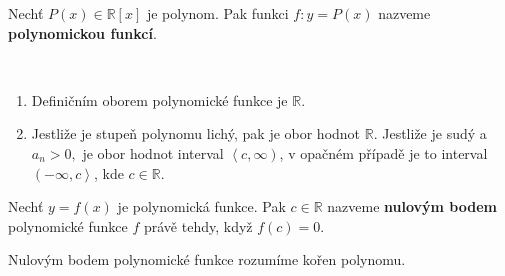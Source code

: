 \begin{definition}
    Nechť $P(x)\in \mathbb R[x]$ je polynom. Pak funkci $f:y=P(x)$ nazveme \textbf{polynomickou funkcí}.
\end{definition}

\begin{pozn}\,
    \begin{enumerate}[$i.$]
        \item Definičním oborem polynomické funkce je $\mathbb R.$
        \item Jestliže je stupeň polynomu lichý, pak je obor hodnot $\mathbb R.$ Jestliže je sudý a $a_n > 0,$ je obor hodnot interval $\left <c,\infty \right )$,
        v opačném případě je to interval $\left (-\infty, c\right >$, kde $c \in \mathbb R$.
    \end{enumerate}
\end{pozn}

\begin{definition}
    Nechť $y=f(x)$ je polynomická funkce. Pak $c\in \mathbb R$ nazveme \textbf{nulovým bodem} polynomické funkce $f$ právě tehdy, když $f(c)=0.$
\end{definition}

\begin{pozn}
    Nulovým bodem polynomické funkce rozumíme kořen polynomu.
\end{pozn}
